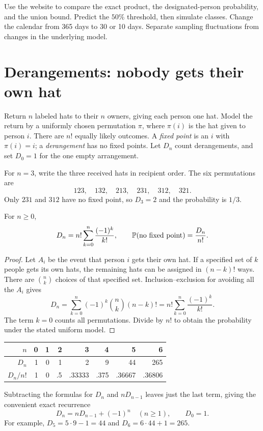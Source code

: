 \begin{labbox}[title={The birthday experiment}]
Use the website to compare the exact product, the designated-person
probability, and the union bound. Predict the $50\%$ threshold, then
simulate classes. Change the calendar from 365 days to 30 or 10 days.
Separate sampling fluctuations from changes in the underlying model.
\end{labbox}

\section{Derangements: nobody gets their own hat}
\label{sec:derangements}

Return $n$ labeled hats to their $n$ owners, giving each person one hat.
Model the return by a uniformly chosen permutation $\pi$, where
$\pi(i)$ is the hat given to person $i$. There are $n!$ equally likely
outcomes. A \emph{fixed point} is an $i$ with $\pi(i)=i$; a
\emph{derangement} has no fixed points. Let $D_n$ count derangements,
and set $D_0=1$ for the one empty arrangement.

For $n=3$, write the three received hats in recipient order. The six
permutations are
\[
 123,\quad132,\quad213,\quad231,\quad312,\quad321.
\]
Only $231$ and $312$ have
no fixed point, so $D_3=2$ and the probability is $1/3$.

\begin{theorem}
For $n\ge0$,
\[
 D_n=n!\sum_{k=0}^n\frac{(-1)^k}{k!},\qquad
 \P(\text{no fixed point})=\frac{D_n}{n!}.
\]
\end{theorem}
\begin{proof}
Let $A_i$ be the event that person $i$ gets their own hat. If a specified
set of $k$ people gets its own hats, the remaining hats can be assigned
in $(n-k)!$ ways. There are $\binom nk$ choices of that specified set.
Inclusion--exclusion for avoiding all the $A_i$ gives
\[
 D_n=\sum_{k=0}^n(-1)^k\binom nk(n-k)!
     =n!\sum_{k=0}^n\frac{(-1)^k}{k!}.
\]
The term $k=0$ counts all permutations. Divide by $n!$ to obtain the
probability under the stated uniform model.
\end{proof}

\begin{center}
\begin{tabular}{@{}rrrrrrrr@{}}
\toprule
$n$&0&1&2&3&4&5&6\\\midrule
$D_n$&1&0&1&2&9&44&265\\
$D_n/n!$&1&0&.5&.33333&.375&.36667&.36806\\\bottomrule
\end{tabular}
\end{center}
Subtracting the formulas for $D_n$ and $nD_{n-1}$ leaves just the last
term, giving the convenient exact recurrence
\[
 D_n=nD_{n-1}+(-1)^n\quad(n\ge1),\qquad D_0=1.
\]
For example, $D_5=5\cdot9-1=44$ and $D_6=6\cdot44+1=265$.

